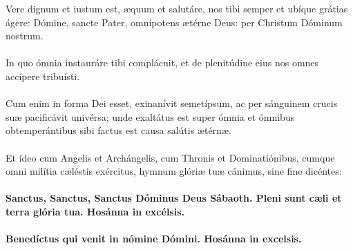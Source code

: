 \documentclass[12pt, a4paper]{article}
\begin{document}
	\newpage
	
	\\
	\\
	\\
	\\
	\\
	Vere dignum et iustum est, æquum
	et salutáre, nos tibi semper et
	ubíque grátias ágere: Dómine,
	sancte Pater, omnípotens ætérne
	Deus: per Christum Dóminum
	nostrum.
	\\\\
	In quo ómnia instauráre tibi complácuit,
	et de plenitúdine eius nos omnes accípere tribuísti.
	\\\\
	Cum enim in forma Dei esset, exinanívit semetípsum,
	ac per sánguinem crucis suæ pacificávit univérsa;
	unde exaltátus est super ómnia
	et ómnibus obtemperántibus sibi
	factus est causa salútis ætérnæ.
	\\\\
	Et ídeo cum Angelis et
	Archángelis, cum Thronis et
	Dominatiónibus, cumque omni
	milítia cæléstis exércitus, hymnum
	glóriæ tuæ cánimus, sine fine
	dicéntes:
	\\\\
	\textbf{Sanctus, Sanctus, Sanctus Dóminus
		Deus Sábaoth. Pleni sunt cæli et
		terra glória tua. Hosánna in
		excélsis.}
	\\\\
	\textbf{Benedíctus qui venit in nómine
		Dómini. Hosánna in excelsis.}
	
	\newpage
	
\end{document}

